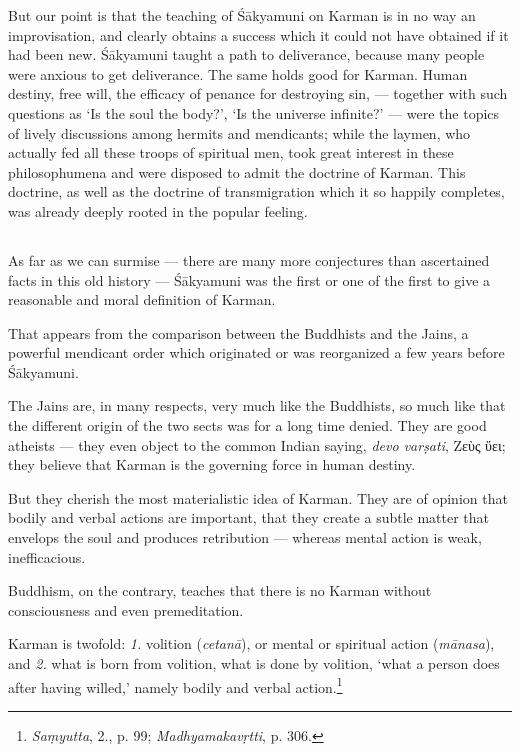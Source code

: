 \documentclass[a4paper, 11pt, oneside, english, landscape]{article}
\begin{document}
But our point is that the teaching of Śākyamuni on Karman is in no way an improvisation, and clearly obtains a success which it could not have obtained if it had been new. Śākyamuni taught a path to deliverance, because many people were anxious to get deliverance. The same holds good for Karman. Human destiny, free will, the efficacy of penance for destroying sin, --- together with such questions as `Is the soul the body?', `Is the universe infinite?' --- were the topics of lively discussions among hermits and mendicants; while the laymen, who actually fed all these troops of spiritual men, took great interest in these philosophumena and were disposed to admit the doctrine of Karman. This doctrine, as well as the doctrine of transmigration which it so happily completes, was already deeply rooted in the popular feeling.

\subsection{}
\paragraph{}
As far as we can surmise --- there are many more conjectures than ascertained facts in this old history --- Śākyamuni was the first or one of the first to give a reasonable and moral definition of Karman.

That appears from the comparison between the Buddhists and the Jains, a powerful mendicant order which originated or was reorganized a few years before Śākyamuni.

The Jains are, in many respects, very much like the Buddhists, so much like that the different origin of the two sects was for a long time denied. They are good atheists --- they even object to the common Indian saying, \emph{devo varṣati}, Ζεὺς ὕει; they believe that Karman is the governing force in human destiny.

But they cherish the most materialistic idea of Karman. They are of opinion that bodily and verbal actions are important, that they create a subtle matter that envelops the soul and produces retribution --- whereas mental action is weak, inefficacious.

Buddhism, on the contrary, teaches that there is no Karman without consciousness and even premeditation.

Karman is twofold: \emph{1.} volition (\emph{cetanā}), or mental or spiritual action (\emph{mānasa}), and \emph{2.} what is born from volition, what is done by volition, `what a person does after having willed,' namely bodily and verbal action.\footnote{\emph{Saṃyutta}, 2., p. 99; \emph{Madhyamakavṛtti}, p. 306.}
\end{document}

